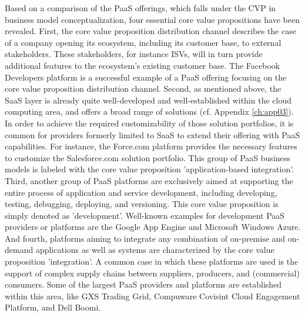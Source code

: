 Based on a comparison of the \ac{PaaS} offerings, which falls under the \ac{CVP} in \citet{Johnson2008} business model conceptualization, four essential core value propositions have been revealed.  First, the core value proposition distribution channel describes the case of a company opening its ecosystem, including its customer base, to external stakeholders. These stakeholders, for instance \acp{ISV}, will in turn provide additional features to the ecosystem's existing customer base. The Facebook Developers platform is a successful example of a \ac{PaaS} offering focusing on the core value proposition distribution channel. Second, as mentioned above, the \ac{SaaS} layer is already quite well-developed and well-established within the cloud computing area, and offers a broad range of solutions (cf. Appendix \ref{ch:app03}). In order to achieve the required customizability of those solution portfolios, it is common for providers formerly limited to \ac{SaaS} to extend their offering with \ac{PaaS} capabilities. For instance, the Force.com platform provides the necessary features to customize the Salesforce.com solution portfolio. This group of \ac{PaaS} business models is labeled with the core value proposition 'application-based integration'. Third, another group of \ac{PaaS} platforms are exclusively aimed at supporting the entire process of application and service development, including developing, testing, debugging, deploying, and versioning. This core value proposition is simply denoted as 'development'. Well-known examples for development \ac{PaaS} providers or platforms are the Google App Engine and Microsoft Windows Azure. And fourth, platforms aiming to integrate any combination of on-premise and on-demand applications as well as systems are characterized by the core value proposition 'integration'. A common case in which these platforms are used is the support of complex supply chains between suppliers, producers, and (commercial) consumers. Some of the largest \ac{PaaS} providers and platforms are established within this area, like GXS Trading Grid, Compuware Covisint Cloud Engagement Platform, and Dell Boomi.

